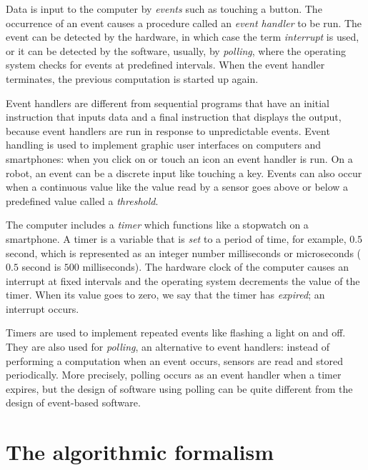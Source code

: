 Data is input to the computer by \emph{events} such as touching a button. The occurrence of an event causes a procedure called an \emph{event handler} to be run. The event can be detected by the hardware, in which case the term \emph{interrupt} is used, or it can be detected by the software, usually, by \emph{polling}, where the operating system checks for events at predefined intervals. When the event handler terminates, the previous computation is started up again.

Event handlers are different from sequential programs that have an initial instruction that inputs data and a final instruction that displays the output, because event handlers are run in response to unpredictable events. Event handling is used to implement graphic user interfaces on computers and smartphones: when you click on or touch an icon an event handler is run. On a robot, an event can be a discrete input like touching a key. Events can also occur when a continuous value like the value read by a sensor goes above or below a predefined value called a \emph{threshold}.

The computer includes a \emph{timer} which functions like a stopwatch on a smartphone. A timer is a variable that is \emph{set} to a period of time, for example, $0.5$ second, which is represented as an integer number milliseconds or microseconds ($0.5$ second is $500$ milliseconds). The hardware clock of the computer causes an interrupt at fixed intervals and the operating system decrements the value of the timer. When its value goes to zero, we say that the timer has \emph{expired}; an interrupt occurs.

Timers are used to implement repeated events like flashing a light on and off. They are also used for \emph{polling}, an alternative to event handlers: instead of performing a computation when an event occurs, sensors are read and stored periodically. More precisely, polling occurs as an event handler when a timer expires, but the design of software using polling can be quite different from the design of event-based software.

\section{The algorithmic formalism}\label{s.alg-formalism}

